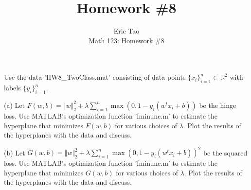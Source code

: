 \documentclass[10pt]{article}
\newenvironment{problem}[2][]{\begin{trivlist}
\item[\hskip \labelsep {\bfseries #1}\hskip \labelsep {\bfseries #2.}]}{\end{trivlist}}
\begin{document}
 
\title{Homework \#8}
\author{Eric Tao\\
Math 123: Homework \#8}
\maketitle

\begin{problem}{Question 1}

Use the data 'HW8\_TwoClass.mat' consisting of data points $\{ x_i \}_{i=1}^n \subset \mathbb{R}^2$ with labels $\{ y_i \}_{i=1}^n$.

(a) Let $F(w,b) = \Vert w \Vert_2^2 + \lambda \sum_{i=1}^n \max(0,1-y_i(w^tx_i +b))$ be the hinge loss. Use MATLAB's optimization function 'fminunc.m' to estimate the hyperplane that minimizes $F(w,b)$ for various choices of $\lambda$. Plot the results of the hyperplanes with the data and discuss.

(b) Let $G(w,b) = \Vert w \Vert_2^2 + \lambda \sum_{i=1}^n \max(0,1-y_i(w^tx_i +b))^2$ be the squared loss. Use MATLAB's optimization function 'fminunc.m' to estimate the hyperplane that minimizes $G(w,b)$ for various choices of $\lambda$. Plot the results of the hyperplanes with the data and discuss.

\end{problem}
\end{document}
